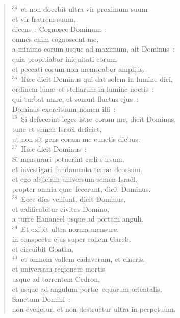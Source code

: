 \begin{flushleft}
\begin{verse}
${}^{34}$~et non docebit ultra vir proximum suum\\ et vir fratrem suum,\\ dicens~: Cognosce Dominum~:\\ omnes enim cognoscent me,\\ a minimo eorum usque ad maximum, ait Dominus~:\\ quia propitiabor iniquitati eorum,\\ et peccati eorum non memorabor amplius.\\
${}^{35}$~H\ae c dicit Dominus qui dat solem in lumine diei,\\ ordinem lun\ae\ et stellarum in lumine noctis~:\\ qui turbat mare, et sonant fluctus ejus~:\\ Dominus exercituum nomen illi~:\\
${}^{36}$~Si defecerint leges ist\ae\ coram me, dicit Dominus,\\ tunc et semen Isra\"el deficiet,\\ ut non sit gens coram me cunctis diebus.\\
${}^{37}$~H\ae c dicit Dominus~:\\ Si mensurari potuerint c\ae li sursum,\\ et investigari fundamenta terr\ae\ deorsum,\\ et ego abjiciam universum semen Isra\"el,\\ propter omnia qu\ae\ fecerunt, dicit Dominus.\\
${}^{38}$~Ecce dies veniunt, dicit Dominus,\\ et \ae dificabitur civitas Domino,\\ a turre Hananeel usque ad portam anguli.\\
${}^{39}$~Et exibit ultra norma mensur\ae \\ in conspectu ejus super collem Gareb,\\ et circuibit Goatha,\\
${}^{40}$~et omnem vallem cadaverum, et cineris,\\ et universam regionem mortis\\ usque ad torrentem Cedron,\\ et usque ad angulum port\ae\ equorum orientalis,\\ Sanctum Domini~:\\ non evelletur, et non destruetur ultra in perpetuum.\end{verse}\end{flushleft}


